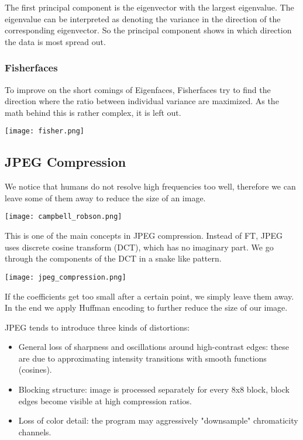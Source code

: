 The first principal component is the eigenvector with the largest eigenvalue. The eigenvalue can be interpreted as denoting the variance in the direction of the corresponding eigenvector. So the principal component shows in which direction the data is most spread out.

\subsubsection{Fisherfaces}

To improve on the short comings of Eigenfaces, Fisherfaces try to find the direction where the ratio between individual variance are maximized. As the math behind this is rather complex, it is left out.
\begin{center}
	\texttt{[image: fisher.png]}
\end{center}


\subsection{JPEG Compression}

We notice that humans do not resolve high frequencies too well, therefore we can leave some of them away to reduce the size of an image.
\begin{center}
	\texttt{[image: campbell\_robson.png]}
\end{center}

This is one of the main concepts in JPEG compression. Instead of FT, JPEG uses discrete cosine transform (DCT), which has no imaginary part. We go through the components of the DCT in a snake like pattern.
\begin{center}
	\texttt{[image: jpeg\_compression.png]}
\end{center}

If the coefficients get too small after a certain point, we simply leave them away. In the end we apply Huffman encoding to further reduce the size of our image. \medskip

JPEG tends to introduce three kinds of distortions:
\begin{itemize}
	\item General loss of sharpness and oscillations around high-contrast edges: these are due to approximating intensity transitions with smooth functions (cosines).
	\item Blocking structure: image is processed separately for every 8x8 block, block edges become visible at high compression ratios.
	\item Loss of color detail: the program may aggressively "downsample" chromaticity channels.
\end{itemize}
